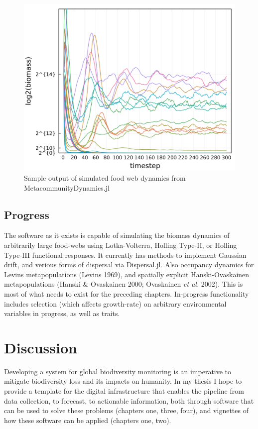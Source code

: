 \documentclass[10pt,oneside]{article}
\makeatletter
\def\maxwidth{\ifdim\Gin@nat@width>\linewidth\linewidth
\else\Gin@nat@width\fi}
\let\Oldincludegraphics\includegraphics
\renewcommand{\includegraphics}[1]{\Oldincludegraphics[width=\maxwidth]{#1}}
\makeatother
\begin{document}
\begin{figure}
\hypertarget{fig:foodwebtraj}{%
\centering
\includegraphics{./figures/foodwebtraj.png}
\caption{Sample output of simulated food web dynamics from
MetacommunityDynamics.jl}\label{fig:foodwebtraj}
}
\end{figure}

\hypertarget{progress-3}{%
\subsection{Progress}\label{progress-3}}

The software as it exists is capable of simulating the biomass dynamics
of arbitrarily large food-webs using Lotka-Volterra, Holling Type-II, or
Holling Type-III functional responses. It currently has methods to
implement Gaussian drift, and verious forms of dispersal via
Dispersal.jl. Also occupancy dynamics for Levins metapopulations (Levins
1969), and spatially explicit Hanski-Ovaskainen metapopulations (Hanski
\& Ovaskainen 2000; Ovaskainen \emph{et al.} 2002). This is most of what
needs to exist for the preceding chapters. In-progress functionality
includes selection (which affects growth-rate) on arbitrary
environmental variables in progress, as well as traits.

\hypertarget{discussion}{%
\section{Discussion}\label{discussion}}

Developing a system for global biodiversity monitoring is an imperative
to mitigate biodiversity loss and its impacts on humanity. In my thesis
I hope to provide a template for the digital infrastructure that enables
the pipeline from data collection, to forecast, to actionable
information, both through software that can be used to solve these
problems (chapters one, three, four), and vignettes of how these
software can be applied (chapters one, two).
\end{document}
